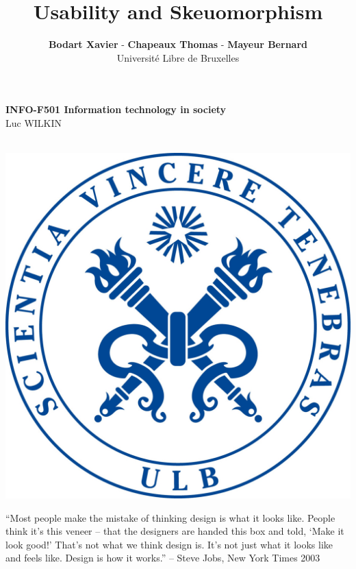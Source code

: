 \documentclass[a4paper,11pt] {article}
\theoremstyle{definition}
\begin{document}
\title{\textbf{Usability and Skeuomorphism}}
\author{\textbf{Bodart Xavier} - \textbf{Chapeaux Thomas} - \textbf{Mayeur Bernard} \\
Université Libre de Bruxelles}

\maketitle
\begin{center}

\textbf{INFO-F501 Information technology in society} \\
Luc WILKIN
\end{center}
\begin{center}

~\\

\includegraphics[scale=0.15]{fig-report/ULBjea.jpg}
\end{center}

\begin{center}
“Most people make the mistake of thinking design is what it looks like. People think it’s this veneer – that the designers are handed this box and told, ‘Make it look good!’ That’s not what we think design is. It’s not just what it looks like and feels like. Design is how it works.” – Steve Jobs, New York Times 2003
\\
\end{center}
\end{document}
